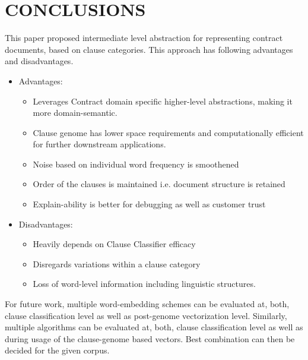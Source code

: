 \documentclass[9pt,academicons]{article}
\begin{document}


\section{CONCLUSIONS}

This paper proposed intermediate level abstraction for representing contract documents, based on clause categories. This approach has following advantages and disadvantages.

 \begin{itemize}
 \item Advantages:
  \begin{itemize}
\item Leverages Contract domain specific higher-level abstractions, making it more domain-semantic.
\item Clause genome has lower space requirements and computationally efficient for further downstream applications.
\item Noise based on individual word frequency is smoothened
\item Order of the clauses is maintained i.e. document structure is retained
\item Explain-ability is better for debugging as well as customer trust
\end{itemize}
\item Disadvantages:
 \begin{itemize}
\item Heavily depends on Clause Classifier efficacy
\item Disregards variations within a clause category
\item Loss of word-level information including linguistic structures.
\end{itemize}
\end{itemize}

For future work, multiple word-embedding schemes can be evaluated at, both, clause classification level as well as post-genome vectorization level. Similarly,  multiple algorithms can be evaluated at, both, clause classification level as well as during usage of the clause-genome based vectors. Best combination can then be decided for the given corpus.
%








\bigskip
\end{document}
